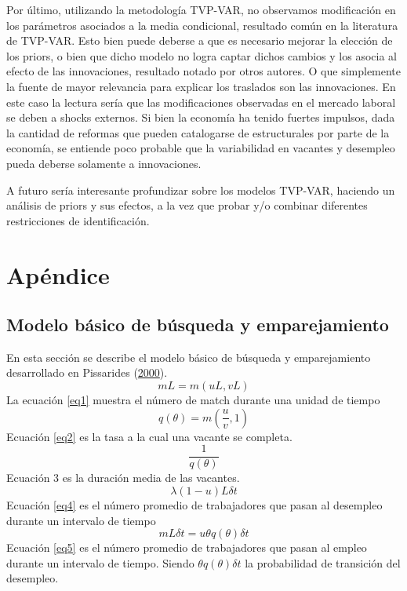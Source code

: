 \documentclass[12pt,oneside]{reedthesis}
\begin{document}
Por último, utilizando la metodología TVP-VAR, no observamos modificación en los parámetros asociados a la media condicional, resultado común en la literatura de TVP-VAR. Esto bien puede deberse a que es necesario mejorar la elección de los priors, o bien que dicho modelo no logra captar dichos cambios y los asocia al efecto de las innovaciones, resultado notado por otros autores. O que simplemente la fuente de mayor relevancia para explicar los traslados son las innovaciones. En este caso la lectura sería que las modificaciones observadas en el mercado laboral se deben a shocks externos. Si bien la economía ha tenido fuertes impulsos, dada la cantidad de reformas que pueden catalogarse de estructurales por parte de la economía, se entiende poco probable que la variabilidad en vacantes y desempleo pueda deberse solamente a innovaciones.

A futuro sería interesante profundizar sobre los modelos TVP-VAR, haciendo un análisis de priors y sus efectos, a la vez que probar y/o combinar diferentes restricciones de identificación.

\appendix

\hypertarget{apuxe9ndice}{%
\chapter{Apéndice}\label{apuxe9ndice}}

\hypertarget{modelo-buxe1sico-de-buxfasqueda-y-emparejamiento}{%
\section{Modelo básico de búsqueda y emparejamiento}\label{modelo-buxe1sico-de-buxfasqueda-y-emparejamiento}}

En esta sección se describe el modelo básico de búsqueda y emparejamiento desarrollado en Pissarides (\protect\hyperlink{ref-Pissarides2000}{2000}).
\begin{equation} \label{eq1}
mL = m(uL, vL)
\end{equation}
La ecuación \eqref{eq1} muestra el número de match durante una unidad de tiempo
\begin{equation} \label{eq2}
q(\theta) = m(\frac{u}{v}, 1)
\end{equation}
Ecuación \eqref{eq2} es la tasa a la cual una vacante se completa.
\begin{equation} \label{eq3}
\frac{1}{q(\theta)}
\end{equation}
Ecuación 3 es la duración media de las vacantes.
\begin{equation} \label{eq4}
\lambda(1-u)L\delta t
\end{equation}
Ecuación \eqref{eq4} es el número promedio de trabajadores que pasan al desempleo durante un intervalo de tiempo
\begin{equation} \label{eq5}
mL\delta t = u\theta q(\theta)\delta t
\end{equation}
Ecuación \eqref{eq5} es el número promedio de trabajadores que pasan al empleo durante un intervalo de tiempo. Siendo \(\theta q(\theta)\delta t\) la probabilidad de transición del desempleo.
\end{document}
